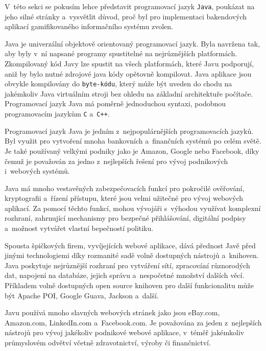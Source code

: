 \documentclass[twoside, 12pt]{article}
\begin{document}
{
V~této sekci se pokusím lehce představit programovací jazyk \texttt{Java},
poukázat na jeho silné stránky
a~vysvětlit důvod, proč byl pro implementaci bakendových aplikací
gamifikovaného informačního systému zvolen.

Java je univerzální objektově orientovaný programovací jazyk.
Byla navržena tak, aby byly v~ní napsané programy spustitelné na nejrůznějších platformách.
Zkompilovaný kód Javy lze spustit na všech platformách, které Javu podporují,
aniž by bylo nutné zdrojové java kódy opětovně kompilovat.
Java aplikace jsou obvykle kompilovány do \texttt{byte-kódu},
který může být uveden do chodu na jakémkoliv Java virtuálním stroji
bez ohledu na základní architektuře počítače.
Programovací jazyk Java má poměrně jednoduchou syntaxi,
podobnou programovacím jazykům \texttt{C} a~\texttt{C++}.
\cite{oracleJava}


Programovací jazyk Java je jedním z~nejpopulárnějších programovacích jazyků.
Byl využit pro vytvoření mnoha bankovních a~finančních systémů po celém světě.
Je také používaný velkými podniky jako je Amazon, Google nebo Facebook,
díky čemuž je považován za jedno z~nejlepších řešení pro vývoj podnikových i~webových systémů.

Java má mnoho vestavěných zabezpečovacích funkcí pro pokročilé ověřování,
kryptografii a~řízení přístupu, které jsou velmi užitečné pro vývoj webových aplikací.
Za pomocí těchto funkcí, mohou vývojáři s~výhodou využívat komplexní
rozhraní, zahrnující mechanismy pro bezpečné přihlášování, digitální podpisy
a~možnost vytvářet vlastní bepečností politiku.

Spousta špičkových firem, vyvíjejících webové aplikace, dává přednost Javě
před jinými technologiemi díky rozmanité sadě volně dostupných nástrojů a~knihoven.
Java poskytuje nejrůznější rozhraní pro vytváření sítí, zpracování různorodých dat,
napojení na databáze, jejich správu a~nespočetné množství dalších věcí.
Příkladem volně dostupných open source knihoven pro další funkcionalitu může být
Apache POI, Google Guava, Jackson a~další.

Javu používá mnoho slavných webových stránek jako jsou
eBay.com, Amazon.com, LinkedIn.com a~Facebook.com.
Je považována za jeden z~nejlepších nástrojů
pro vývoj jakékoliv podnikové webové aplikace,
v~téměř jakémkoliv průmyslovém odvětví včetně zdravotnictví,
výroby či finančnictví.

}
\end{document}
